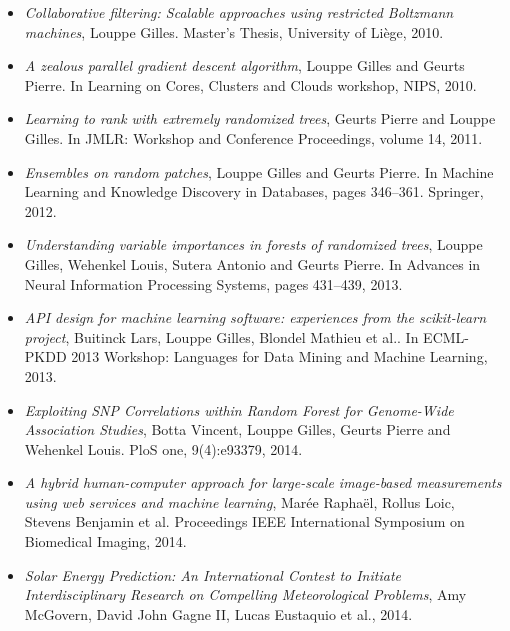 \begin{itemize}

\item \citep{louppe:2010b} \textit{Collaborative filtering: Scalable approaches using restricted Boltzmann machines},
Louppe Gilles. Master's Thesis, University of Li{\`e}ge, 2010.

\item \citep{louppe:2010} \textit{A zealous parallel gradient descent algorithm},
Louppe Gilles and Geurts Pierre.
In Learning on Cores, Clusters and Clouds workshop, NIPS, 2010.

\item \citep{geurts:2011} \textit{Learning to rank with extremely randomized trees},
Geurts Pierre and Louppe Gilles.
In JMLR: Workshop and Conference Proceedings, volume 14, 2011.

\item \citep{louppe:2012} \textit{Ensembles on random patches},
Louppe Gilles and Geurts Pierre.
In Machine Learning and Knowledge Discovery in Databases, pages 346--361. Springer, 2012.

\item \citep{louppe:2013} \textit{Understanding variable importances in forests of randomized trees},
Louppe Gilles, Wehenkel Louis, Sutera Antonio and Geurts Pierre.
In Advances in Neural Information Processing Systems, pages 431--439, 2013.

\item \citep{buitinck:2013} \textit{API design for machine learning software: experiences from the scikit-learn project},
Buitinck Lars, Louppe Gilles, Blondel Mathieu et al..
In ECML-PKDD 2013 Workshop: Languages for Data Mining and Machine Learning, 2013.

\item \citep{botta:2014} \textit{Exploiting SNP Correlations within Random Forest for Genome-Wide Association Studies},
Botta Vincent, Louppe Gilles, Geurts Pierre and Wehenkel Louis.
PloS one, 9(4):e93379, 2014.

\item \citep{maree:2014} \textit{A hybrid human-computer approach for large-scale image-based measurements using web services and machine learning},
Mar{\'e}e Rapha{\"e}l, Rollus Loic, Stevens Benjamin et al.
Proceedings IEEE International Symposium on Biomedical Imaging, 2014.

\item \citep{amy:2014} \textit{Solar Energy Prediction: An International Contest to Initiate Interdisciplinary Research on Compelling Meteorological Problems},
Amy McGovern, David John Gagne II, Lucas Eustaquio et al., 2014.


\end{itemize}
